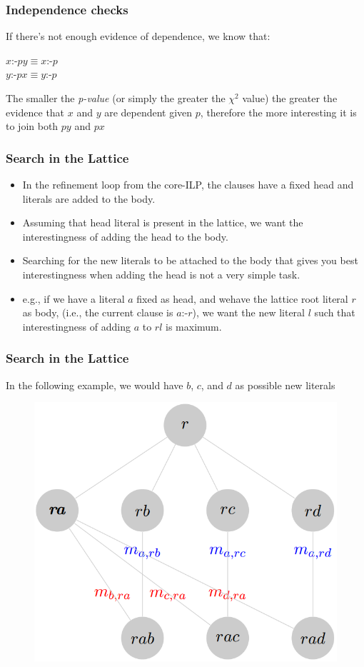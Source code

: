 \documentclass{beamer}
\begin{document}
\begin{frame}
\frametitle{Independence checks}
  If there's not enough evidence of dependence, we know that:
  \begin{center}
   $x$:-$py \equiv x$:-$p$ \\
   $y$:-$px \equiv y$:-$p$
  \end{center}
  The smaller the \emph{p-value} (or simply the greater the $\chi^2$ value) the greater the evidence that $x$ and
$y$ are dependent given $p$, therefore the more interesting it is to join both $py$ and $px$
\end{frame}

\begin{frame}
\frametitle{Search in the Lattice}
  \begin{itemize}
   \item In the refinement loop from the core-ILP, the clauses have a fixed head and literals are added to the body.
   \item Assuming that head literal is present in the lattice, we want the interestingness of adding the head to the
body.
   \item Searching for the new literals to be attached to the body that gives you best interestingness when adding the
head is not a very simple task.
   \item e.g., if we have a literal $a$ fixed as head, and wehave the lattice root literal $r$ as body,
(i.e., the current clause is $a$:-$r$), we want the new literal $l$ such that interestingness of adding $a$ to $rl$ is
maximum.
  \end{itemize}
\end{frame}

\begin{frame}
\frametitle{Search in the Lattice}
  In the following example, we would have $b$, $c$, and $d$ as possible new literals
  \begin{figure}
  \includegraphics[height=0.5\textheight]{./Figures/headmap}
  \end{figure}
\end{frame}
\end{document}
